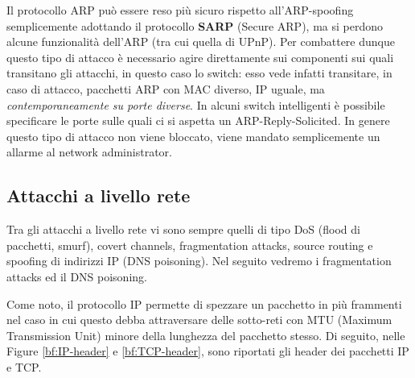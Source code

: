 Il protocollo ARP può essere reso più sicuro rispetto all'ARP-spoofing semplicemente adottando il protocollo \textbf{SARP} (Secure ARP), ma si perdono alcune funzionalità dell'ARP (tra cui quella di UPnP). Per combattere dunque questo tipo di attacco è necessario agire direttamente sui componenti sui quali transitano gli attacchi, in questo caso lo switch: esso vede infatti transitare, in caso di attacco, pacchetti ARP con MAC diverso, IP uguale, ma \textit{contemporaneamente su porte diverse}. In alcuni switch intelligenti è possibile specificare le porte sulle quali ci si aspetta un ARP-Reply-Solicited. In genere questo tipo di attacco non viene bloccato, viene mandato semplicemente un allarme al network administrator.

\subsection{Attacchi a livello rete}
Tra gli attacchi a livello rete vi sono sempre quelli di tipo DoS (flood di pacchetti, smurf), covert channels, fragmentation attacks, source routing e spoofing di indirizzi IP (DNS poisoning). Nel seguito vedremo i fragmentation attacks ed il DNS poisoning.

Come noto, il protocollo IP permette di spezzare un pacchetto in più frammenti nel caso in cui questo debba attraversare delle sotto-reti con MTU (Maximum Transmission Unit) minore della lunghezza del pacchetto stesso. Di seguito, nelle Figure \ref{bf:IP-header} e \ref{bf:TCP-header}, sono riportati gli header dei pacchetti IP e TCP.

